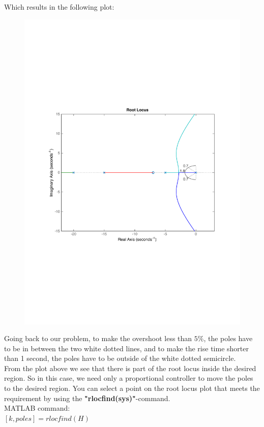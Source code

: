 \begin{frame}
	\begin{exampleblock}{}
		Which results in the following plot:
		\vspace{-0.5em}
		\begin{figure}
			\centering
			\includegraphics[width=0.7\linewidth]{matlab_ex2}
		\end{figure}
	\end{exampleblock}
\end{frame}

\begin{frame}
	\begin{exampleblock}{}
		Going back to our problem, to make the overshoot less than $5\%$, the poles have to be in between the two white dotted lines, and to make the rise time shorter than 1 second, the poles have to be outside of the white dotted semicircle.\\
		\vspace{1em}
		From the plot above we see that there is part of the root locus inside the desired region. So in this case, we need only a proportional controller to move the poles to the desired region. You can select a point on the root locus plot that meets the requirement by using the \textbf{"rlocfind(sys)"}-command.\\
		\vspace{1em}
		MATLAB command:\\
		$[k,poles] = rlocfind(H)$
	\end{exampleblock}
\end{frame}

